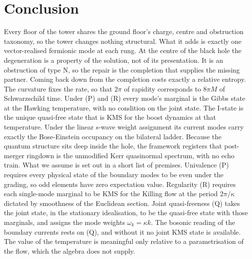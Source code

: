 \documentclass[11pt]{article}
\theoremstyle{definition}
\theoremstyle{plain}
\begin{document}
\section*{Conclusion}
Every floor of the tower shares the ground floor's charge, centre and obstruction taxonomy, so the tower changes nothing structural. What it adds is exactly one vector-realised fermionic mode at each rung. At the centre of the black hole the degeneration is a property of the solution, not of its presentation. It is an obstruction of type N, so the repair is the completion that supplies the missing partner. Coming back down from the completion costs exactly a relative entropy. The curvature fixes the rate, so that $2\pi$ of rapidity corresponds to $8\pi M$ of Schwarzschild time. Under (P) and (R) every mode's marginal is the Gibbs state at the Hawking temperature, with no condition on the joint state. The I-state is the unique quasi-free state that is KMS for the boost dynamics at that temperature. Under the linear s-wave weight assignment its current modes carry exactly the Bose-Einstein occupancy on the bilateral ladder. Because the quantum structure sits deep inside the hole, the framework registers that post-merger ringdown is the unmodified Kerr quasinormal spectrum, with no echo train. What we assume is set out in a short list of premises. Univalence (P) requires every physical state of the boundary modes to be even under the grading, so odd elements have zero expectation value. Regularity (R) requires each single-mode marginal to be KMS for the Killing flow at the period $2\pi/\kappa$ dictated by smoothness of the Euclidean section. Joint quasi-freeness (Q) takes the joint state, in the stationary idealisation, to be the quasi-free state with those marginals, and assigns the mode weights $\omega_k = \kappa k$. The bosonic reading of the boundary currents rests on (Q), and without it no joint KMS state is available. The value of the temperature is meaningful only relative to a parametrisation of the flow, which the algebra does not supply.
\end{document}
